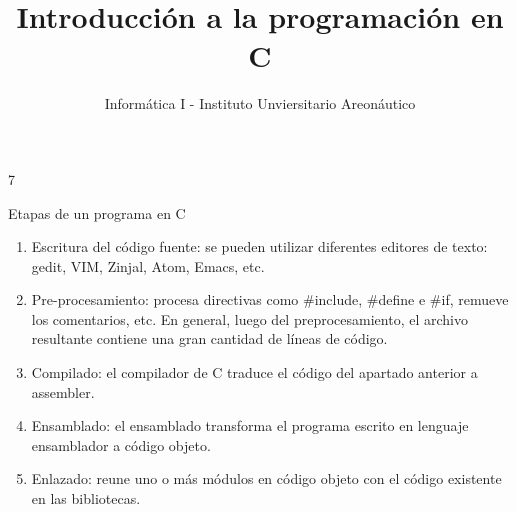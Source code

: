 7\documentclass[xcolor=pdftex,table,11pt]{beamer}
\author{Informática I - Instituto Unviersitario Areonáutico}
\title{Introducción a la programación en C}
\begin{document}
\begin{frame}
\titlepage
\end{frame}

\begin{frame}
\tableofcontents
\end{frame}



\begin{frame}{Etapas de un programa en C }

 \begin{enumerate}
   
     	\item<1->  Escritura del código fuente: se pueden utilizar diferentes editores de texto: gedit, VIM, Zinjal, Atom, Emacs, etc. 
     	
\href{https://github.com/danis963/informaticaI_IUA/blob/main/c/c_detras_de_escena/volumen_esfera.c}{}


        \item<2->  Pre-procesamiento: procesa directivas como $\#$include, $\#$define e $\#$if, remueve los comentarios, etc. En general, luego del preprocesamiento, el archivo resultante contiene una gran cantidad de líneas de código.
       
		\href{https://github.com/danis963/informaticaI_IUA/blob/main/c/c_detras_de_escena/volumen_esfera.i}{}
		
		
	\item<3->  Compilado: el compilador de C traduce el código del apartado anterior a assembler. 
     
		\href{https://github.com/danis963/informaticaI_IUA/blob/main/c/c_detras_de_escena/volumen_esfera.s}{}
		
		
				\item<4->  Ensamblado: el ensamblado transforma el programa escrito en lenguaje ensamblador a código objeto. 
		
		\href{https://github.com/danis963/informaticaI_IUA/blob/main/c/c_detras_de_escena/volumen_esfera.o}{}

				\item<5->  Enlazado: reune uno o más módulos en código objeto con el código existente en las bibliotecas.
		
		\href{https://github.com/danis963/informaticaI_IUA/blob/main/c/c_detras_de_escena/a.out}{}

   \end{enumerate}

\end{frame}
\end{document}
